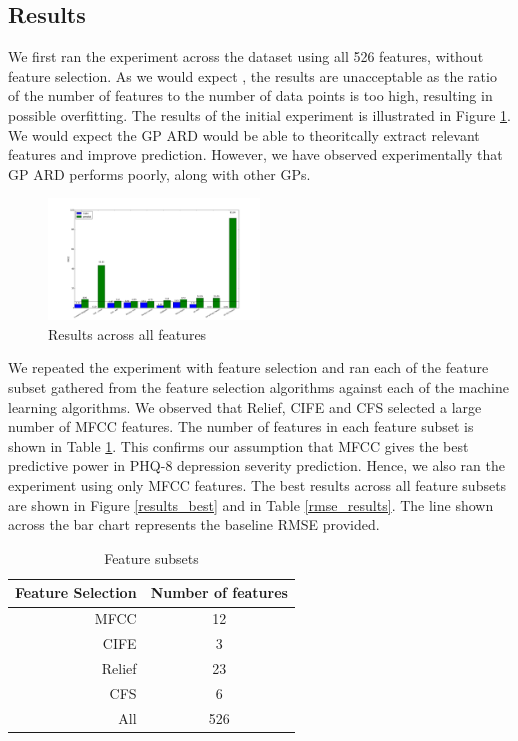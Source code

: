 \documentclass{article}
\begin{document}
	\subsection{Results}
	We first ran the experiment across the dataset using all 526 features, without feature selection. 
	As we would expect \cite{Cawley2014}, the results are unacceptable as the ratio of the number of features to the number of data points is too high,
	resulting in possible overfitting. 
	The results of the initial experiment is illustrated in Figure \ref{results_all}. 
	We would expect the GP ARD would be able to theoritcally extract relevant features and improve prediction.
	However, we have observed experimentally that GP ARD performs poorly, along with other GPs. \\

	\begin{figure}[h]
 		\begin{center}
		\includegraphics[width=0.5\textwidth]{results_all} 
  		\end{center}
  		\caption{Results across all features}
  		\label{results_all}
 	\end{figure}
	
	We repeated the experiment with feature selection and ran each of the feature subset gathered from the feature selection algorithms against each of the machine 
	learning algorithms. 
	We observed that Relief, CIFE and CFS selected a large number of MFCC features. 
	The number of features in each feature subset is shown in Table \ref{feat_subset}. 
	This confirms our assumption that MFCC gives the best predictive power in PHQ-8 depression severity prediction. 
	Hence, we also ran the experiment using only MFCC features. 
	The best results across all feature subsets are shown in Figure \ref{results_best} and in Table \ref{rmse_results}. The line shown across the 
	bar chart represents the baseline RMSE provided. \\

 	\begin{table}[h]
 		\begin{center}
  			\begin{tabular}{ | r | c | }
    			\hline
			 \bfseries Feature Selection 	&\bfseries Number of features \\ \hline
			 MFCC           			& 12 \\ \hline
			 CIFE        				& 3 \\ \hline
			 Relief 				& 23 \\ \hline
			 CFS 					& 6 \\ \hline
			 All 					& 526 \\ \hline
			 \end{tabular}
		\end{center}
 	\caption{Feature subsets}
 	\label{feat_subset}
 	\end{table}
\end{document}
